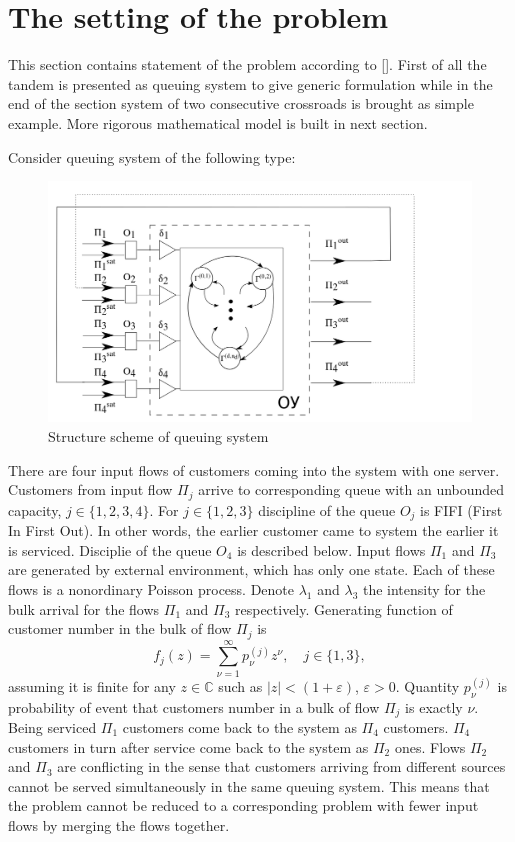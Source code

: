 \documentclass[10pt]{article}
\begin{document}
\section{The setting of the problem}

This section contains statement of the problem according to []. First of all the tandem is presented as queuing system to give generic formulation while in the end of the section system of two consecutive crossroads is brought as simple example. More rigorous mathematical model is built in next section.

Consider queuing system of the following type:
\begin{figure}[h!]
   \centering
    \includegraphics[width=\textwidth]{SystemScheme.png} %
    \caption {Structure scheme of queuing system}
    \label{pic1}
\end{figure}
There are four input flows of customers coming into the system with one server. Customers from input flow $\Pi_j$ arrive to corresponding queue with an unbounded capacity, $j \in \{1,2,3,4\}$. For $j \in \{1,2,3\}$ discipline of the queue $O_j$ is FIFI (First In First Out). In other words, the earlier customer came to system the earlier it is serviced. Disciplie of the queue $O_4$ is described below. Input flows $\Pi_1$ and $\Pi_3$ are generated by external environment, which has only one state. Each of these flows is a nonordinary Poisson process. Denote $\lambda_1$ and $\lambda_3$ the intensity for the bulk arrival for the flows $\Pi_1$ and $\Pi_3$ respectively. Generating function of customer number in the bulk of flow $\Pi_j$ is
\begin{equation}
f_j(z) = \sum_{\nu=1}^{\infty} p_{\nu}^{(j)} z ^{\nu}, \quad j\in \{1,3\},
\label{GeneratingFunc}
\end{equation}
assuming it is finite for any $z\in \mathbb{C}$ such as $|z|<(1+\varepsilon)$, $\varepsilon>0$. Quantity $p_{\nu}^{(j)}$ is probability of event that customers number in a bulk of flow $\Pi_j$ is exactly $\nu$. Being serviced $\Pi_1$ customers come back to the system as $\Pi_4$ customers. $\Pi_4$ customers in turn after service come back to the system as $\Pi_2$ ones. Flows $\Pi_2$ and $\Pi_3$ are conflicting in the sense that customers arriving from different sources cannot be served simultaneously in the same queuing system. This means that the problem cannot be reduced to a corresponding problem with fewer input flows by merging the flows together.
\end{document}
